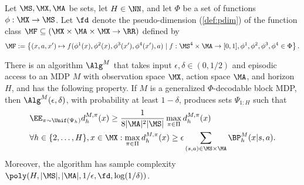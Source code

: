 \begin{theorem}\label{thm:mbfr-pdim}
Let $\MS,\MX, \MA$ be sets, let $H \in \NN$, and let $\Phi$ be a set of functions $\phi: \MX\to\MS$. Let $\fd$ denote the pseudo-dimension (\cref{def:pdim}) of the function class $\MF \subseteq (\MX\times\MA\times\MX \to \RR)$ defined by
\begin{equation} \MF := \left\{(x,a,x') \mapsto f(\phi^1(x),\phi^2(x),\phi^3(x'),\phi^4(x'),a) \mid{} f: \MS^4\times\MA \to [0,1], \phi^1,\phi^2,\phi^3,\phi^4 \in \Phi\right\}.\label{eq:disc-class-mbfr}\end{equation}

There is an algorithm $\Alg^M$ that takes input $\epsilon,\delta \in (0,1/2)$ and episodic access to an MDP $M$ with observation space $\MX$, action space $\MA$, and horizon $H$, and has the following property. If $M$ is a generalized $\Phi$-decodable block MDP, then $\Alg^M(\epsilon,\delta)$, with probability at least $1-\delta$, produces sets $\Psi_{1:H}$ such that
\begin{align} &\EE_{\pi\sim\Unif(\Psi_h)} d^{M,\pi}_h(x) \geq \frac{1}{8|\MA|^2|\MS|} \max_{\pi\in\Pi} d^{M,\pi}_h(x) \nonumber\\
&\forall h \in \{2,\dots,H\}, x \in \MX: \max_{\pi\in\Pi} d^{M,\pi}_h(x) \geq \epsilon \sum_{(s,a)\in\MS\times\MA} \BP^M_{h}(x|s,a).\label{eq:vox-guarantee}
\end{align}
Moreover, the algorithm has sample complexity $\poly(H,|\MS|,|\MA|,1/\epsilon,\fd,\log(1/\delta))$.
\end{theorem}


